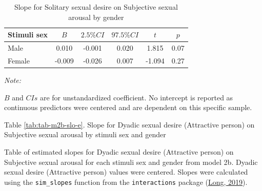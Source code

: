 \documentclass[
  bookmarksnumbered]{article}
\begin{document}
\begin{table}[H]

\caption{\label{tab:tab-m2b-slo-d}Slope for Solitary sexual desire on Subjective sexual arousal by gender}
\centering
\begin{threeparttable}
\begin{tabular}[t]{lccccc}
\toprule
Stimuli sex & $B$ & $2.5\% CI$ & $97.5\% CI$ & $t$ & $p$\\
\midrule
Male & 0.010 & -0.001 & 0.020 & 1.815 & 0.07\\
Female & -0.009 & -0.026 & 0.007 & -1.094 & 0.27\\
\bottomrule
\end{tabular}
\begin{tablenotes}[para]
\item \textit{Note: } 
\item $B$ and $CIs$ are for unstandardized coefficient.
           No intercept is reported as continuous predictors were centered
           and are dependent on this specific sample.
\end{tablenotes}
\end{threeparttable}
\end{table}

Table \ref{tab:tab-m2b-slo-e}. Slope for Dyadic sexual desire (Attractive person) on Subjective sexual arousal by stimuli sex and gender

Table of estimated slopes for Dyadic sexual desire (Attractive person) on Subjective sexual arousal for each stimuli sex and gender from model 2b. Dyadic sexual desire (Attractive person) values were centered. Slopes were calculated using the \texttt{sim\_slopes} function from the \texttt{interactions} package (\protect\hyperlink{ref-interactionscit}{Long, 2019}).
\end{document}
